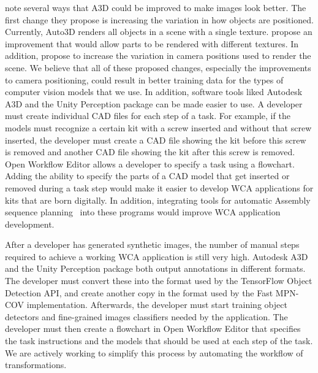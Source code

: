 \citet{Wang_2022_CVPR} note several ways that A3D could be improved to make
images look better.
The first change they propose is increasing the variation in how objects are
positioned.
Currently, Auto3D renders all objects in a scene with a single texture.
\citet{Wang_2022_CVPR} propose an improvement that would allow parts to be
rendered with different textures.
In addition, \citet{Wang_2022_CVPR} propose to increase the variation in camera
positions used to render the scene.
We believe that all of these proposed changes, especially the improvements to
camera positioning, could result in better training data for the types of
computer vision models that we use.
In addition, software tools liked Autodesk A3D and the Unity Perception package
can be made easier to use.
A developer must create individual CAD files for each step of a task.
For example, if the models must recognize a certain kit with a screw
inserted and without that screw inserted, the developer must create a CAD file
showing the kit before this screw is removed and another CAD file showing the
kit after this screw is removed.
Open Workflow Editor allows a developer to specify a task using a flowchart.
Adding the ability to specify the parts of a CAD model that get inserted or
removed during a task step would make it easier to develop
WCA applications for kits that are born digitally.
In addition, integrating tools for automatic Assembly sequence
planning~\cite{subassembly_identification} into these programs would improve WCA
application development.

After a developer has generated synthetic images, the number of manual steps
required to achieve a working WCA application is still very high.
Autodesk A3D and the Unity Perception package both output annotations in
different formats.
The developer must convert these into the format used by the TensorFlow Object
Detection API, and create another copy in the format used by the Fast MPN-COV
implementation.
Afterwards, the developer must start training object detectors and fine-grained
images classifiers needed by the application.
The developer must then create a flowchart in Open Workflow Editor that
specifies the task instructions and the models that should be used at each step
of the task.
We are actively working to simplify this process by automating the workflow of
transformations.
